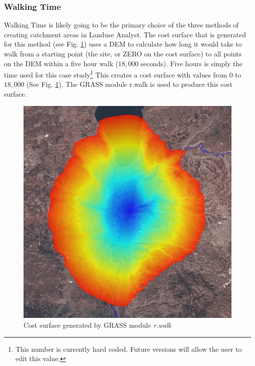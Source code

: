   \subsubsection{Walking Time}
  
  Walking Time is likely going to be the primary choice of the three methods of
  creating catchment areas in Landuse Analyst.  The cost surface that is
  generated for this method (see Fig. \ref{fig:rwalk}) uses a DEM to calculate
  how long it would take to walk from a starting point (the site, or ZERO on
  the cost surface) to all points on the DEM within a five hour walk ($18,000$
  seconds). Five hours is simply the time used for this case
  study\footnote{This number is currently hard coded. Future versions will
  allow the user to edit this value.} This creates a cost surface with values
  from $0$ to $18,000$ (See Fig. \ref{fig:rwalk}).  The GRASS module r.walk is
  used to produce this cost surface.

\begin{figure}[htbp] \centering
\includegraphics[scale=0.29]{./images/rwalkShuna.jpg}
   \caption{Cost surface generated by GRASS module
   \textit{r.walk}} \label{fig:rwalk} \end{figure}

